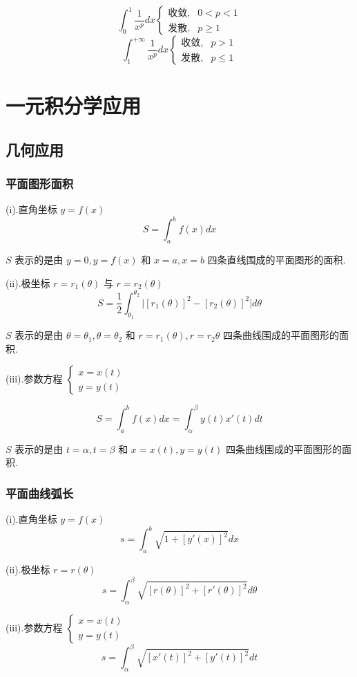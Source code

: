 \begin{corollary}[p级数判别法]
	$$\int_{0}^{1}\frac{1}{x^{p}}dx\begin{cases} \text{收敛}, &0 < p < 1 \\ \text{发散},& p\geq 1  \end{cases}$$
	$$\int_{1}^{+\infty}\frac{1}{x^{p}}dx\begin{cases} \text{收敛}, &p > 1 \\ \text{发散},& p\leq 1  \end{cases}$$
\end{corollary}

\section{一元积分学应用}

\subsection{几何应用}
\subsubsection{平面图形面积}
\begin{definition}[定积分几何意义]

	(i).直角坐标 $y=f(x)$
	$$S=\int_{a}^{b}f(x)dx$$

	$S$ 表示的是由 $y=0,y=f(x)$ 和 $x=a,x=b$ 四条直线围成的平面图形的面积.

	(ii).极坐标 $r=r_{1}(\theta)$ 与 $r=r_{2}(\theta)$
	$$S=\dfrac{1}{2}\int_{\theta_{1}}^{\theta_{2}}\big|[r_{1}(\theta)]^{2}-[r_{2}(\theta)]^{2}\big|d\theta$$

	$S$ 表示的是由 $\theta=\theta_{1},\theta=\theta_{2}$ 和 $r=r_{1}(\theta),r=r_{2}\theta$ 四条曲线围成的平面图形的面积.

	(iii).参数方程 $\left\lbrace
		\begin{array}{l}
			x=x(t) \\
			y=y(t)
		\end{array}
		\right. $

	$$S=\int_{a}^{b}f(x)dx = \int_{\alpha}^{\beta}y(t)x'(t)dt$$

	$S$ 表示的是由 $t=\alpha,t=\beta$ 和 $x=x(t),y=y(t)$ 四条曲线围成的平面图形的面积.
	
\end{definition}
\subsubsection{平面曲线弧长}
\begin{theorem}[平面曲线的弧长]

	(i).直角坐标 $y=f(x)$
	$$s=\int_{a}^{b}\sqrt{1+[y'(x)]^{2}}dx$$

	(ii).极坐标 $r=r(\theta)$
	$$s=\int_{\alpha}^{\beta}\sqrt{[r(\theta)]^{2}+[r'(\theta)]^{2}}d\theta$$

	(iii).参数方程 $\left\lbrace
		\begin{array}{l}
			x=x(t) \\
			y=y(t)
		\end{array}
		\right. $
	$$s=\int_{\alpha}^{\beta}\sqrt{[x'(t)]^{2}+[y'(t)]^{2}}dt$$
\end{theorem}
